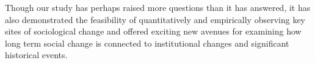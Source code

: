 Though our study has perhaps raised more questions than it has answered, it has also demonstrated the feasibility of quantitatively and empirically observing key sites of sociological change and offered exciting new avenues for examining how long term social change is connected to institutional changes and significant historical events.


